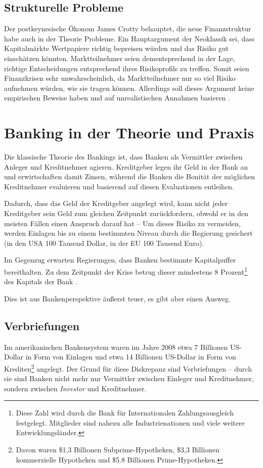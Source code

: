\documentclass[a4paper,11pt]{report}
\begin{document}
\subsection{Strukturelle Probleme}
Der postkeynesische \"Okonom James Crotty behauptet, die neue Finanzstruktur
habe auch in der Theorie Probleme. Ein Hauptargument der Neoklassik sei, dass
Kapitalm\"arkte Wertpapiere richtig bepreisen w\"urden und das Risiko gut einsch\"atzen
k\"onnten. Marktteilnehmer seien dementsprechend in der Lage,
richtige Entscheidungen entsprechend ihres Risikoprofils zu treffen.
Somit seien Finanzkrisen sehr unwahrscheinlich, da Marktteilnehmer nur so viel
Risiko aufnehmen w\"urden, wie sie tragen k\"onnen. Allerdings soll dieses Argument
keine empirischen Beweise haben und auf unrealistischen Annahmen basieren
\parencite[563--565]{crottycam}.

\section{Banking in der Theorie und Praxis}
Die klassische Theorie des Bankings ist, dass Banken als Vermittler
zwischen Anleger und Kreditnehmer agieren. Kreditgeber legen ihr Geld
in der Bank an und erwirtschaften damit Zinsen, w\"ahrend die Banken die
Bonit\"at der m\"oglichen Kreditnehmer evaluieren und basierend
auf diesen Evaluationen entleihen.

Dadurch, dass das Geld der Kreditgeber angelegt wird, kann nicht jeder
Kreditgeber sein Geld zum gleichen Zeitpunkt zur\"uckfordern, obwohl er
in den meisten F\"allen einen Anspruch darauf hat -- Um dieses Risiko
zu vermeiden, werden Einlagen bis zu einem bestimmten Niveau durch
die Regierung gesichert (in den USA 100 Tausend Dollar, in der EU 100 Tausend Euro).

Im Gegenzug erwarten Regierungen, dass Banken bestimmte Kapitalpuffer
bereithalten. Zu dem Zeitpunkt der Krise betrug dieser mindestens 8 Prozent\footnote{
  Diese Zahl wird durch die Bank für Internationalen Zahlungsausgleich
  festgelegt. Mitglieder sind nahezu alle Industrienationen und viele
  weitere Entwicklungsl\"ander.
} des Kapitals der Bank \parencite[197--198]{acharyar}.

Dies ist aus Bankenperspektive \"außerst teuer,
es gibt aber einen Ausweg.

\subsection{Verbriefungen}
Im amerikanischen Bankensystem waren im Jahre 2008 etwa 7 Billionen US-Dollar
in Form von Einlagen und etwa 14 Billionen
US-Dollar in Form von Krediten\footnote{
  Davon waren \$1,3 Billionen Subprime-Hypotheken, \$3,3 Billionen kommerzielle
  Hypotheken und \$5.8 Billionen Prime-Hypotheken.} angelegt.
Der Grund f\"ur diese Diskrepanz sind Verbriefungen --
durch sie sind Banken nicht mehr nur Vermittler
zwischen Einleger und Kreditnehmer, sondern zwischen
\textit{Investor} und Kreditnehmer.
\end{document}

